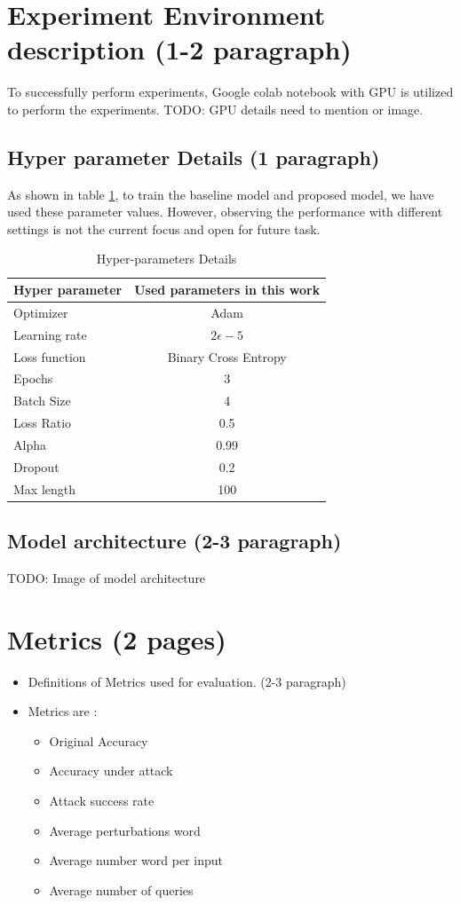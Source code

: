 \documentclass[%
	BCOR=8mm, %
	DIV=12, 
	toc=bibliography, %
	toc=listof, %
	oneside, %
	egregdoesnotlikesansseriftitles, %
	]{scrbook}
\begin{document}
\section{Experiment Environment description (1-2 paragraph)}
To successfully perform experiments, Google colab notebook with GPU is utilized to perform the experiments. 
TODO: GPU details need to mention or image. 
\subsection{ Hyper parameter Details (1 paragraph)}
 As shown in table \ref{table:HyperparameterTable}, to train the baseline model and proposed model, we have used these parameter values. However, observing the performance with different settings is not the current focus  and open for future task.
\begin{table}[!h]
\centering
\begin{tabular}{ l c c }
\hline
Hyper parameter 		& \multicolumn{2}{c}{Used parameters in this work}\\
\hline
Optimizer 				& \multicolumn{2}{c}{Adam} \\
Learning rate 			& \multicolumn{2}{c}{ $2\epsilon -5$ } \\
Loss function 			& \multicolumn{2}{c}{Binary Cross Entropy}  \\
Epochs 				& \multicolumn{2}{c}{$3$} \\
Batch Size 			& \multicolumn{2}{c}{4 } \\
Loss Ratio 			&\multicolumn{2}{c}{0.5}\\
Alpha 			&\multicolumn{2}{c}{0.99}\\
Dropout  			& \multicolumn{2}{c}{0.2}  \\
Max length 			 & \multicolumn{2}{c}{100}  \\
\hline
\end{tabular}
\caption[Hyper-parameters with test run results]{Hyper-parameters Details}
\label{table:HyperparameterTable}
\end{table}
\subsection{ Model architecture (2-3 paragraph)}
TODO: Image of model architecture 
\section{Metrics (2 pages)}
\begin{itemize}
\item Definitions of Metrics used for evaluation. (2-3 paragraph)
\item Metrics are :
\begin{itemize}
\item Original Accuracy 
\item Accuracy under attack 
\item Attack success rate 
\item Average perturbations word 
\item Average number word per input
\item Average number of queries 
\end{itemize}
\end{itemize}
\end{document}
